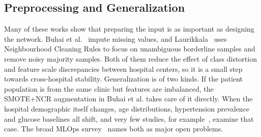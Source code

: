 \documentclass[10pt,journal,compsoc]{IEEEtran}
\begin{document}
\subsection{Preprocessing and Generalization}
Many of these works show that preparing the input is as important as designing the network. Buhai et al.~\cite{buhai2026} impute missing values, and Laurikkala~\cite{laurikkala2001} uses Neighbourhood Cleaning Rules to focus on unambiguous borderline samples and remove noisy majority samples. Both of them reduce the effect of class distortion and feature scale discrepancies between hospital centers, so it is a small step towards cross-hospital stability. Generalization is of two kinds. If the patient population is from the same clinic but features are imbalanced, the SMOTE+NCR augmentation in Buhai et al. takes care of it directly. When the hospital demographic itself changes, age distributions, hypertension prevalence and glucose baselines all shift, and very few studies, for example~\cite{chowdary2022}, examine that case. The broad MLOps survey~\cite{paleyes2022} names both as major open problems.
\end{document}
